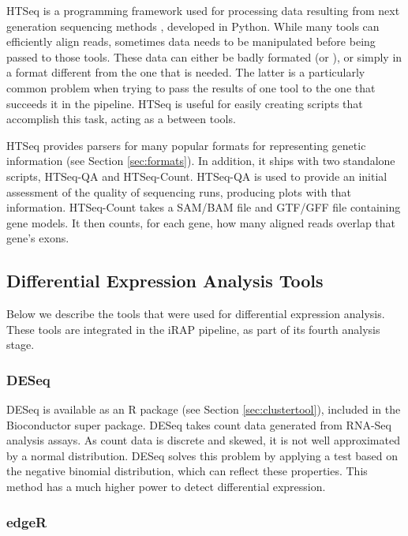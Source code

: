 HTSeq is a programming framework used for processing data resulting from next
generation sequencing methods \cite{htseq}, developed in Python. While many
tools can efficiently align reads, sometimes data needs to be manipulated before
being passed to those tools. These data can either be badly formated (or
), or simply in a format different from the one that is needed. The
latter is a particularly common problem when trying to pass the results of one
tool to the one that succeeds it in the pipeline. HTSeq is useful for easily
creating scripts that accomplish this task, acting as a  between tools.

HTSeq provides parsers for many popular formats for representing genetic
information (see Section \ref{sec:formats}). In addition, it ships with two
standalone scripts, HTSeq-QA and HTSeq-Count. HTSeq-QA is used to provide an
initial assessment of the quality of sequencing runs, producing plots with that
information. HTSeq-Count takes a SAM/BAM file and GTF/GFF file containing gene
models. It then counts, for each gene, how many aligned reads overlap that
gene's exons.

\subsection{Differential Expression Analysis Tools}\label{sec:difexptools}

Below we describe the tools that were used for differential expression analysis.
These tools are integrated in the iRAP pipeline, as part of its fourth analysis
stage.

\subsubsection*{DESeq}

DESeq \cite{20979621} is available as an R package (see Section
\ref{sec:clustertool}), included in the Bioconductor super package. DESeq takes
count data generated from RNA-Seq analysis assays. As count data is discrete and
skewed, it is not well approximated by a normal distribution. DESeq solves this
problem by applying a test based on the negative binomial distribution, which
can reflect these properties. This method has a much higher power to detect
differential expression.

\subsubsection*{edgeR}

